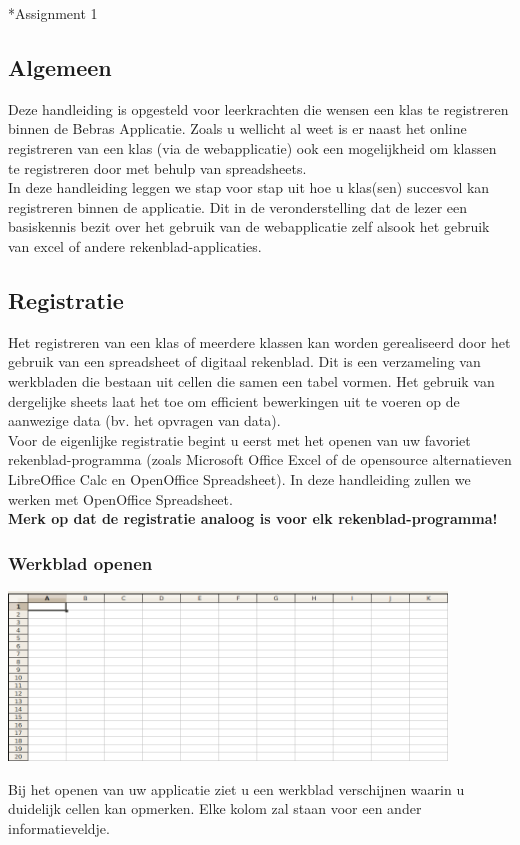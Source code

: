 \begin{section}*{Assignment 1}
 \subsection{Algemeen}
Deze handleiding is opgesteld voor leerkrachten die wensen een klas te registreren binnen de Bebras Applicatie. Zoals u wellicht al weet is er naast het online registreren van een klas (via de webapplicatie) ook een mogelijkheid om klassen te registreren door met behulp van spreadsheets. \\
In deze handleiding leggen we stap voor stap uit hoe u klas(sen) succesvol kan registreren binnen de applicatie. Dit in de veronderstelling dat de lezer een basiskennis bezit over het gebruik van de webapplicatie zelf alsook het gebruik van excel of andere rekenblad-applicaties.
\subsection{Registratie}
Het registreren van een klas of meerdere klassen kan worden gerealiseerd door het gebruik van een spreadsheet of digitaal rekenblad. Dit is een verzameling van werkbladen die bestaan uit cellen die samen een tabel vormen. Het gebruik van dergelijke sheets laat het toe om efficient bewerkingen uit te voeren op de aanwezige data (bv. het opvragen van data).\\
Voor de eigenlijke registratie begint u eerst met het openen van uw favoriet rekenblad-programma (zoals Microsoft Office Excel of de opensource alternatieven LibreOffice Calc en OpenOffice Spreadsheet). In deze handleiding zullen we werken met OpenOffice Spreadsheet.\\
\textbf{Merk op dat de registratie analoog is voor elk rekenblad-programma!}\\
\subsubsection{Werkblad openen}
\begin{center}
\includegraphics[height=4.5cm]{img/werkblad.png}
\end{center}
Bij het openen van uw applicatie ziet u een werkblad verschijnen waarin u duidelijk cellen kan opmerken. Elke kolom zal staan voor een ander informatieveldje. 

\end{section}
